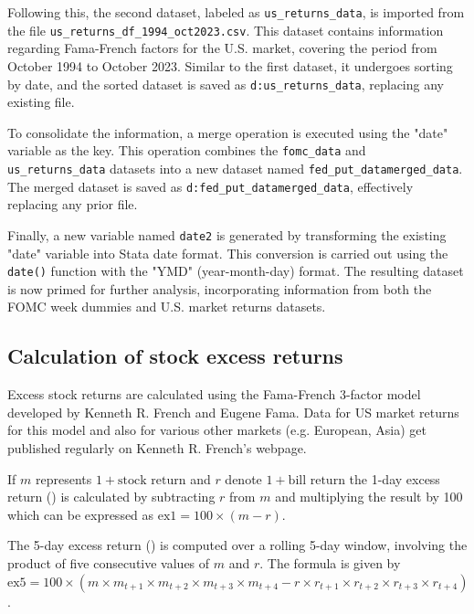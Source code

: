 Following this, the second dataset, labeled as \texttt{us\_returns\_data}, is imported from the file \texttt{us\_returns\_df\_1994\_oct2023.csv}. This dataset contains information regarding Fama-French factors for the U.S. market, covering the period from October 1994 to October 2023. Similar to the first dataset, it undergoes sorting by date, and the sorted dataset is saved as \texttt{d:us\_returns\_data}, replacing any existing file.

To consolidate the information, a merge operation is executed using the "date" variable as the key. This operation combines the \texttt{fomc\_data} and \texttt{us\_returns\_data} datasets into a new dataset named \texttt{fed\_put\_datamerged\_data}. The merged dataset is saved as \texttt{d:fed\_put\_datamerged\_data}, effectively replacing any prior file.

Finally, a new variable named \texttt{date2} is generated by transforming the existing "date" variable into Stata date format. This conversion is carried out using the \texttt{date()} function with the "YMD" (year-month-day) format. The resulting dataset is now primed for further analysis,  incorporating information from both the FOMC week dummies and U.S. market returns datasets.

\subsection{Calculation of stock excess returns}

Excess stock returns are calculated using the Fama-French 3-factor model developed by Kenneth R.  French and Eugene Fama.  
Data for US market returns for this model and also for various other markets (e.g.  European,  Asia) get published regularly on Kenneth R.  French's webpage. \parencite{kenneth_r_kenneth_nodate}

If \(m\) represents \(1 + \text{{stock return}}\) and \(r\) denote \(1 + \text{{bill return}}\) the 1-day excess return () is calculated by subtracting \(r\) from \(m\) and multiplying the result by 100 which can be expressed as \(\text{{ex1}} = 100 \times (m - r)\). 

The 5-day excess return () is computed over a rolling 5-day window, involving the product of five consecutive values of \(m\) and \(r\). The formula is given by \(\text{{ex5}} = 100 \times (m \times m_{t+1} \times m_{t+2} \times m_{t+3} \times m_{t+4} - r \times r_{t+1} \times r_{t+2} \times r_{t+3} \times r_{t+4})\).

